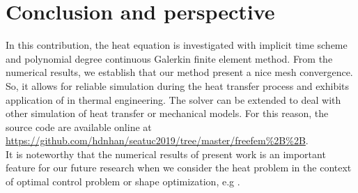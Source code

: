 \documentclass[twocolumn]{article}
\begin{document}
\section{Conclusion and perspective}
In this contribution, the heat equation is investigated with implicit time scheme and polynomial degree continuous Galerkin finite element method. From the numerical results, we establish that our method present a nice mesh convergence. So, it allows for reliable simulation during the heat transfer process and exhibits application of in thermal engineering. The solver can be extended to deal with other simulation of heat transfer or mechanical models. For this reason, the source code are available online at \url{https://github.com/hdnhan/seatuc2019/tree/master/freefem\%2B\%2B}. 
\\
It is noteworthy that the numerical results of present work is an important feature for our future research when we consider the heat problem in the context of optimal control problem \cite{HTLI14} or shape optimization, e.g \cite{TLP18}. 

{}
\vfill
\end{document}
